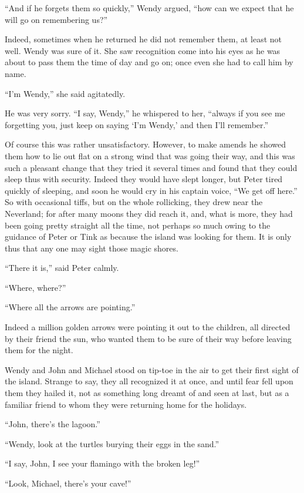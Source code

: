 “And if he forgets them so quickly,” Wendy argued,
“how can we expect that he will go on remembering us?”

Indeed, sometimes when he returned he did not remember them, at least not well.
Wendy was sure of it.
She saw recognition come into his eyes as he was about to pass them the time of day and go on;
once even she had to call him by name.

“I’m Wendy,” she said agitatedly.

He was very sorry.
“I say, Wendy,” he whispered to her,
“always if you see me forgetting you,
just keep on saying ‘I’m Wendy,’ and then I’ll remember.”

Of course this was rather unsatisfactory.
However, to make amends he showed them how to lie out flat on a strong wind that was going their way,
and this was such a pleasant change that they tried it several times
and found that they could sleep thus with security.
Indeed they would have slept longer, but Peter tired quickly of sleeping,
and soon he would cry in his captain voice, “We get off here.”
So with occasional tiffs, but on the whole rollicking, they drew near the Neverland;
for after many moons they did reach it, and, what is more,
they had been going pretty straight all the time,
not perhaps so much owing to the guidance of Peter or Tink as because the island was looking for them.
It is only thus that any one may sight those magic shores.

“There it is,” said Peter calmly.

“Where, where?”

“Where all the arrows are pointing.”

Indeed a million golden arrows were pointing it out to the children,
all directed by their friend the sun,
who wanted them to be sure of their way before leaving them for the night.

Wendy and John and Michael stood on tip‐toe in the air to get their first sight of the island.
Strange to say, they all recognized it at once,
and until fear fell upon them they hailed it,
not as something long dreamt of and seen at last,
but as a familiar friend to whom they were returning home for the holidays.

“John, there’s the lagoon.”

“Wendy, look at the turtles burying their eggs in the sand.”

“I say, John, I see your flamingo with the broken leg!”

“Look, Michael, there’s your cave!”

